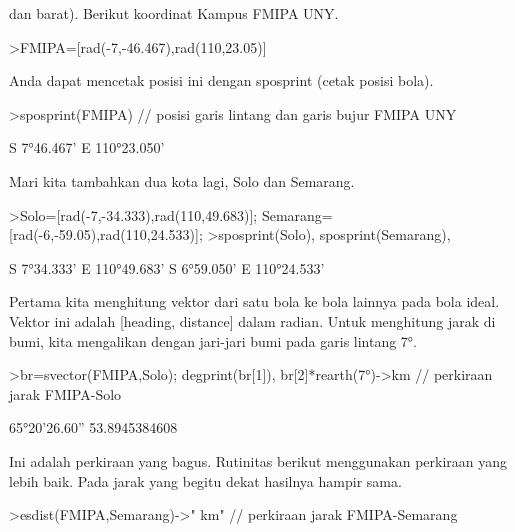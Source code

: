 \documentclass[12pt,Times new roman,letterpaper]{book}
\begin{document}
\begin{eulernootebook}
\begin{eulercomment}
\begin{eulercomment}
\begin{eulernootebook}
\begin{eulercomment}
\begin{eulercomment}
\begin{eulercomment}
\begin{eulercomment}
\begin{eulercomment}
\begin{eulercomment}
\begin{eulernotebook}
\begin{eulercomment}
\begin{eulercomment}
\begin{eulercomment}
\begin{eulercomment}
\begin{eulercomment}
\begin{eulercomment}
dan barat). Berikut koordinat Kampus FMIPA UNY.
\end{eulercomment}
\begin{eulerprompt}
>FMIPA=[rad(-7,-46.467),rad(110,23.05)]
\end{eulerprompt}
\begin{euleroutput}
  [-0.13569,  1.92657]
\end{euleroutput}
\begin{eulercomment}
Anda dapat mencetak posisi ini dengan sposprint (cetak posisi bola).
\end{eulercomment}
\begin{eulerprompt}
>sposprint(FMIPA) // posisi garis lintang dan garis bujur FMIPA UNY
\end{eulerprompt}
\begin{euleroutput}
  S 7°46.467' E 110°23.050'
\end{euleroutput}
\begin{eulercomment}
Mari kita tambahkan dua kota lagi, Solo dan Semarang.
\end{eulercomment}
\begin{eulerprompt}
>Solo=[rad(-7,-34.333),rad(110,49.683)]; Semarang=[rad(-6,-59.05),rad(110,24.533)];
>sposprint(Solo), sposprint(Semarang),
\end{eulerprompt}
\begin{euleroutput}
  S 7°34.333' E 110°49.683'
  S 6°59.050' E 110°24.533'
\end{euleroutput}
\begin{eulercomment}
Pertama kita menghitung vektor dari satu bola ke bola lainnya pada
bola ideal. Vektor ini adalah [heading, distance] dalam radian. Untuk
menghitung jarak di bumi, kita mengalikan dengan jari-jari bumi pada
garis lintang 7°.
\end{eulercomment}
\begin{eulerprompt}
>br=svector(FMIPA,Solo); degprint(br[1]), br[2]*rearth(7°)->km // perkiraan jarak FMIPA-Solo
\end{eulerprompt}
\begin{euleroutput}
  65°20'26.60''
  53.8945384608
\end{euleroutput}
\begin{eulercomment}
Ini adalah perkiraan yang bagus. Rutinitas berikut menggunakan
perkiraan yang lebih baik. Pada jarak yang begitu dekat hasilnya
hampir sama.
\end{eulercomment}
\begin{eulerprompt}
>esdist(FMIPA,Semarang)->" km" // perkiraan jarak FMIPA-Semarang

\end{eulerprompt}
\end{eulercomment}
\end{eulercomment}
\end{eulercomment}
\end{eulercomment}
\end{eulercomment}
\end{eulernotebook}
\end{eulercomment}
\end{eulercomment}
\end{eulercomment}
\end{eulercomment}
\end{eulercomment}
\end{eulercomment}
\end{eulernootebook}
\end{eulercomment}
\end{eulercomment}
\end{eulernootebook}
\end{document}
